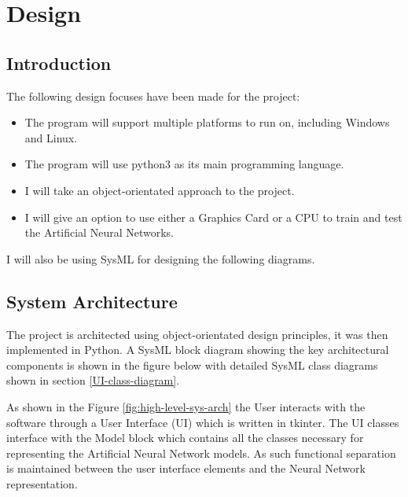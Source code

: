 \documentclass[./project-report/src/latex/project-report.tex]{subfiles}
\begin{document}
\maketitle

\clearpage
\section{Design}

\subsection{Introduction}

The following design focuses have been made for the project:

\begin{itemize}
    \item The program will support multiple platforms to run on, including Windows and Linux.
    \item The program will use python3 as its main programming language.
    \item I will take an object-orientated approach to the project.
    \item I will give an option to use either a Graphics Card or a CPU to train and test the Artificial Neural Networks.
\end{itemize}

I will also be using SysML for designing the following diagrams.

\subsection{System Architecture}

The project is architected using object-orientated design principles, it was then implemented in Python. A SysML block diagram showing the key architectural components is 
shown in the figure below with detailed SysML class diagrams shown in section \ref{UI-class-diagram}.

As shown in the Figure \ref{fig:high-level-sys-arch} the User interacts with the software through a User Interface (UI) which is written in tkinter. The UI classes interface 
with the Model block which contains all the classes necessary for representing the Artificial Neural Network models. As such functional separation is maintained between the 
user interface elements and the Neural Network representation.
\end{document}
